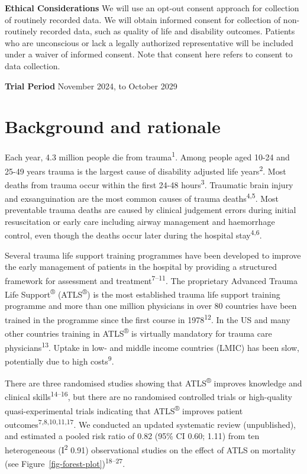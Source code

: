 \documentclass[
]{scrartcl}
\begin{document}
\textbf{Ethical Considerations} We will use an opt-out consent approach
for collection of routinely recorded data. We will obtain informed
consent for collection of non-routinely recorded data, such as quality
of life and disability outcomes. Patients who are unconscious or lack a
legally authorized representative will be included under a waiver of
informed consent. Note that consent here refers to consent to data
collection.

\textbf{Trial Period} November 2024, to October 2029

\newpage{}

\hypertarget{background-and-rationale}{%
\section{Background and rationale}\label{background-and-rationale}}

Each year, 4.3 million people die from trauma\textsuperscript{1}. Among
people aged 10-24 and 25-49 years trauma is the largest cause of
disability adjusted life years\textsuperscript{2}. Most deaths from
trauma occur within the first 24-48 hours\textsuperscript{3}. Traumatic
brain injury and exsanguination are the most common causes of trauma
deaths\textsuperscript{4,5}. Most preventable trauma deaths are caused
by clinical judgement errors during initial resuscitation or early care
including airway management and haemorrhage control, even though the
deaths occur later during the hospital stay\textsuperscript{4,6}.

Several trauma life support training programmes have been developed to
improve the early management of patients in the hospital by providing a
structured framework for assessment and
treatment\textsuperscript{7--11}. The proprietary Advanced Trauma Life
Support\textsuperscript{®} (ATLS\textsuperscript{®}) is the most
established trauma life support training programme and more than one
million physicians in over 80 countries have been trained in the
programme since the first course in 1978\textsuperscript{12}. In the US
and many other countries training in ATLS\textsuperscript{®} is
virtually mandatory for trauma care physicians\textsuperscript{13}.
Uptake in low- and middle income countries (LMIC) has been slow,
potentially due to high costs\textsuperscript{9}.

There are three randomised studies showing that ATLS\textsuperscript{®}
improves knowledge and clinical skills\textsuperscript{14--16}, but
there are no randomised controlled trials or high-quality
quasi-experimental trials indicating that ATLS\textsuperscript{®}
improves patient outcomes\textsuperscript{7,8,10,11,17}. We conducted an
updated systematic review (unpublished), and estimated a pooled risk
ratio of 0.82 (95\% CI 0.60; 1.11) from ten heterogeneous
(I\textsuperscript{2} 0.91) observational studies on the effect of ATLS
on mortality (see Figure~\ref{fig-forest-plot})\textsuperscript{18--27}.
\end{document}
